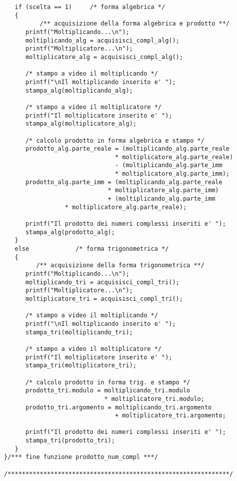 \documentclass[a4paper,10pt]{article}
\begin{document}
\begin{verbatim}
   if (scelta == 1)		/* forma algebrica */
   {
          /** acquisizione della forma algebrica e prodotto **/
      printf("Moltiplicando...\n");
      moltiplicando_alg = acquisisci_compl_alg();
      printf("Moltiplicatore...\n");
      moltiplicatore_alg = acquisisci_compl_alg();

      /* stampo a video il moltiplicando */
      printf("\nIl moltiplicando inserito e' ");
      stampa_alg(moltiplicando_alg);

      /* stampo a video il moltiplicatore */
      printf("Il moltiplicatore inserito e' ");
      stampa_alg(moltiplicatore_alg);

      /* calcolo prodotto in forma algebrica e stampo */
      prodotto_alg.parte_reale = (moltiplicando_alg.parte_reale 
                               * moltiplicatore_alg.parte_reale) 
                               - (moltiplicando_alg.parte_imm
                               * moltiplicatore_alg.parte_imm);
      prodotto_alg.parte_imm = (moltiplicando_alg.parte_reale 
                             * moltiplicatore_alg.parte_imm)
                             + (moltiplicando_alg.parte_imm
			     * moltiplicatore_alg.parte_reale);

      printf("Il prodotto dei numeri complessi inseriti e' ");
      stampa_alg(prodotto_alg);
   }
   else				/* forma trigonometrica */
   {
         /** acquisizione della forma trigonometrica **/
      printf("Moltiplicando...\n");
      moltiplicando_tri = acquisisci_compl_tri();
      printf("Moltiplicatore...\n");
      moltiplicatore_tri = acquisisci_compl_tri();

      /* stampo a video il moltiplicando */
      printf("\nIl moltiplicando inserito e' ");
      stampa_tri(moltiplicando_tri);

      /* stampo a video il moltiplicatore */
      printf("Il moltiplicatore inserito e' ");
      stampa_tri(moltiplicatore_tri);

      /* calcolo prodotto in forma trig. e stampo */
      prodotto_tri.modulo = moltiplicando_tri.modulo
                            * moltiplicatore_tri.modulo;
      prodotto_tri.argomento = moltiplicando_tri.argomento
                               + moltiplicatore_tri.argomento;

      printf("Il prodotto dei numeri complessi inseriti e' ");
      stampa_tri(prodotto_tri);
   }
}/*** fine funzione prodotto_num_compl ***/

/**************************************************************/


\end{verbatim}
\end{document}
